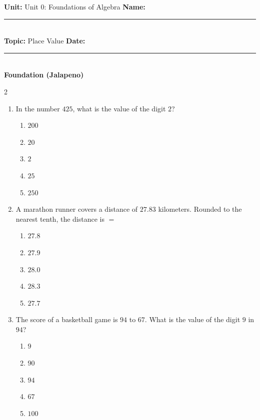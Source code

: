 \documentclass[10pt]{article}
\begin{document}
\enlargethispage{2.5cm}

\begin{tcolorbox}[colback=mainblue!5, colframe=mainblue, sharp corners, boxrule=0.5pt]
    \small \textbf{Unit:} Unit 0: Foundations of Algebra \hfill \textbf{Name:} \rule{3cm}{0.4pt} \\
    \small \textbf{Topic:} Place Value \hfill \textbf{Date:} \rule{2cm}{0.4pt} \\
    \centering \textbf{\large Foundation (Jalapeno)}
\end{tcolorbox}

\vspace{0.2cm}

\begin{multicols}{2}
\begin{enumerate}[label=\textbf{Q\arabic*.}, leftmargin=*, itemsep=6pt, parsep=0pt]

  \item \small In the number $425$, what is the value of the digit $2$?
  \begin{enumerate}[label=(\Alph*), leftmargin=0.6cm, nosep, itemsep=2pt]
    \item $200$
    \item $20$
    \item $2$
    \item $25$
    \item $250$
  \end{enumerate}

  \item \small A marathon runner covers a distance of $27.83$ kilometers. Rounded to the nearest tenth, the distance is $=$
  \begin{enumerate}[label=(\Alph*), leftmargin=0.6cm, nosep, itemsep=2pt]
    \item $27.8$
    \item $27.9$
    \item $28.0$
    \item $28.3$
    \item $27.7$
  \end{enumerate}

  \item \small The score of a basketball game is $94$ to $67$. What is the value of the digit $9$ in $94$?
  \begin{enumerate}[label=(\Alph*), leftmargin=0.6cm, nosep, itemsep=2pt]
    \item $9$
    \item $90$
    \item $94$
    \item $67$
    \item $100$
  \end{enumerate}


\end{enumerate}
\end{multicols}
\end{document}
